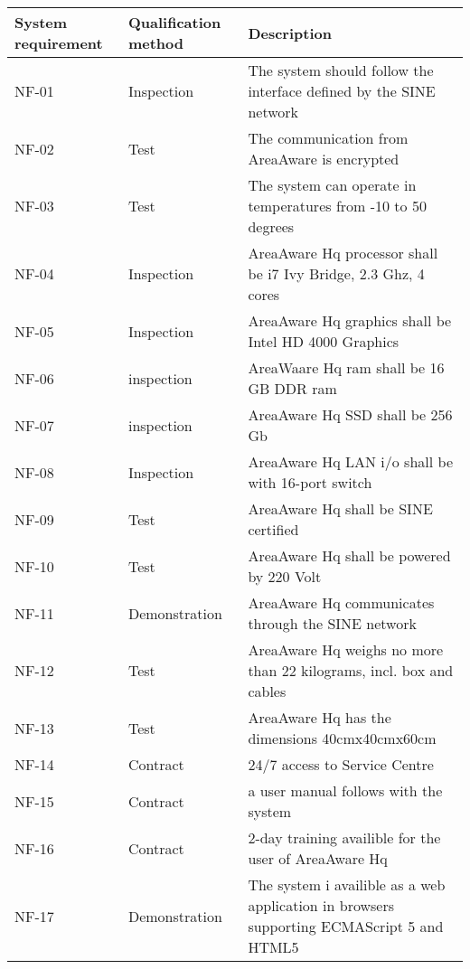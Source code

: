 \begin{longtable}{| p{2.4cm}  | p{2.6cm} | p{6.6cm} |  }
	\hline
	\textbf{System requirement}	& \textbf{Qualification method} & \textbf{Description} \\ \hline
	NF-01	& Inspection	& The system should follow the interface defined by the SINE network \\ \hline
	NF-02	& Test			& The communication from AreaAware is encrypted  \\ \hline
	NF-03	& Test			& The system can operate in temperatures from -10 to 50 degrees \\ \hline
	NF-04	& Inspection	& AreaAware Hq processor shall be i7 Ivy Bridge, 2.3 Ghz, 4 cores \\ \hline
	NF-05	& Inspection	& AreaAware Hq graphics shall be Intel HD 4000 Graphics \\ \hline
	NF-06	& inspection	& AreaWaare Hq ram shall be 16 GB DDR ram \\ \hline
	NF-07	& inspection	& AreaAware Hq SSD shall be 256 Gb \\ \hline
	NF-08	& Inspection	& AreaAware Hq LAN i/o shall be with 16-port switch \\ \hline
	NF-09	& Test			& AreaAware Hq shall be SINE certified \\ \hline
	NF-10	& Test			& AreaAware Hq shall be powered by 220 Volt \\ \hline
	NF-11	& Demonstration	& AreaAware Hq communicates through the SINE network \\ \hline
	NF-12	& Test			& AreaAware Hq  weighs no more than 22 kilograms, incl. box and cables\\ \hline
	NF-13	& Test			& AreaAware Hq has the dimensions 40cmx40cmx60cm\\ \hline
	NF-14	& Contract		& 24/7 access to Service Centre\\ \hline
	NF-15	& Contract		& a user manual follows with the system\\ \hline
	NF-16	& Contract		& 2-day training availible for the user of AreaAware Hq \\ \hline
	NF-17	& Demonstration	& The system i availible as a web application in browsers supporting ECMAScript 5 and HTML5\\ \hline
	
\end{longtable}